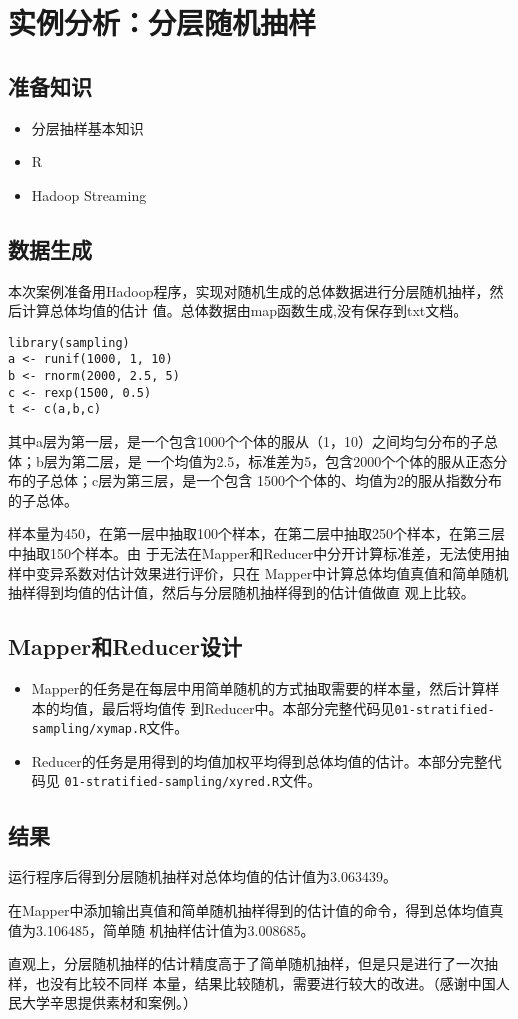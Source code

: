 \section{实例分析：分层随机抽样}\label{ux5b9eux4f8bux5206ux6790ux5206ux5c42ux968fux673aux62bdux6837}

\subsection{准备知识}\label{ux51c6ux5907ux77e5ux8bc6}

\begin{itemize}
\itemsep1pt\parskip0pt
\item
  分层抽样基本知识
\item
  R
\item
  Hadoop Streaming
\end{itemize}

\subsection{数据生成}\label{ux6570ux636eux751fux6210}

本次案例准备用Hadoop程序，实现对随机生成的总体数据进行分层随机抽样，然后计算总体均值的估计
值。总体数据由map函数生成,没有保存到txt文档。

\begin{lstlisting}
library(sampling)
a <- runif(1000, 1, 10)
b <- rnorm(2000, 2.5, 5)
c <- rexp(1500, 0.5)
t <- c(a,b,c)
\end{lstlisting}

其中a层为第一层，是一个包含1000个个体的服从（1，10）之间均匀分布的子总体；b层为第二层，是
一个均值为2.5，标准差为5，包含2000个个体的服从正态分布的子总体；c层为第三层，是一个包含
1500个个体的、均值为2的服从指数分布的子总体。

样本量为450，在第一层中抽取100个样本，在第二层中抽取250个样本，在第三层中抽取150个样本。由
于无法在Mapper和Reducer中分开计算标准差，无法使用抽样中变异系数对估计效果进行评价，只在
Mapper中计算总体均值真值和简单随机抽样得到均值的估计值，然后与分层随机抽样得到的估计值做直
观上比较。

\subsection{Mapper和Reducer设计}\label{mapperux548creducerux8bbeux8ba1}

\begin{itemize}
\item
  Mapper的任务是在每层中用简单随机的方式抽取需要的样本量，然后计算样本的均值，最后将均值传
  到Reducer中。本部分完整代码见\lstinline!01-stratified-sampling/xymap.R!文件。
\item
  Reducer的任务是用得到的均值加权平均得到总体均值的估计。本部分完整代码见
  \lstinline!01-stratified-sampling/xyred.R!文件。
\end{itemize}

\subsection{结果}\label{ux7ed3ux679c}

运行程序后得到分层随机抽样对总体均值的估计值为3.063439。

在Mapper中添加输出真值和简单随机抽样得到的估计值的命令，得到总体均值真值为3.106485，简单随
机抽样估计值为3.008685。

直观上，分层随机抽样的估计精度高于了简单随机抽样，但是只是进行了一次抽样，也没有比较不同样
本量，结果比较随机，需要进行较大的改进。（感谢中国人民大学辛思提供素材和案例。）
